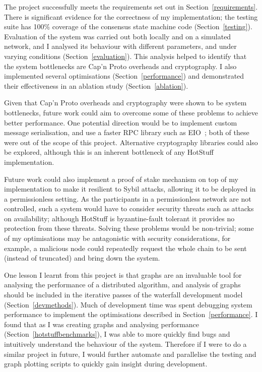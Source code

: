 The project successfully meets the requirements set out in Section~\ref{requirements}. There is significant evidence for the correctness of my implementation; the testing suite has 100\% coverage of the consensus state machine code (Section~\ref{testing}). Evaluation of the system was carried out both locally and on a simulated network, and I analysed its behaviour with different parameters, and under varying conditions (Section~\ref{evaluation}). This analysis helped to identify that the system bottlenecks are Cap'n Proto overheads and cryptography. I also implemented several optimisations (Section~\ref{performance}) and demonstrated their effectiveness in an ablation study (Section~\ref{ablation}).

Given that Cap'n Proto overheads and cryptography were shown to be system bottlenecks, future work could aim to overcome some of these problems to achieve better performance. One potential direction would be to implement custom message serialisation, and use a faster RPC library such as EIO~\cite{eio}; both of these were out of the scope of this project. Alternative cryptography libraries could also be explored, although this is an inherent bottleneck of any HotStuff implementation.

Future work could also implement a proof of stake mechanism on top of my implementation to make it resilient to Sybil attacks, allowing it to be deployed in a permissionless setting. As the participants in a permissionless network are not controlled, such a system would have to consider  security threats such as attacks on availability; although HotStuff is byzantine-fault tolerant it provides no protection from these threats. Solving these problems would be non-trivial; some of my optimisations may be antagonistic with security considerations, for example, a malicious node could repeatedly request the whole chain to be sent (instead of truncated) and bring down the system.

One lesson I learnt from this project is that graphs are an invaluable tool for analysing the performance of a distributed algorithm, and analysis of graphs should be included in the iterative passes of the waterfall development model (Section~\ref{devmethods}). Much of development time was spent debugging system performance to implement the optimisations described in Section~\ref{performance}. I found that as I was creating graphs and analysing performance (Section~\ref{hotstuffbenchmarks}), I was able to more quickly find bugs and intuitively understand the behaviour of the system. Therefore if I were to do a similar project in future, I would further automate and parallelise the testing and graph plotting scripts to quickly gain insight during development.

